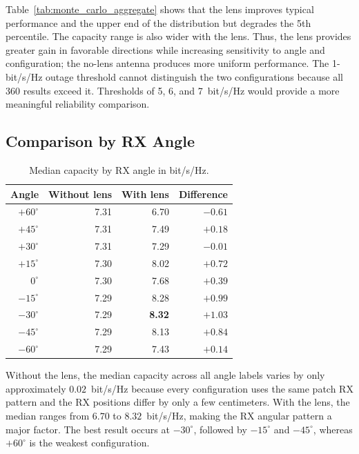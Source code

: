 \documentclass[10pt]{article}
\begin{document}
Table~\ref{tab:monte_carlo_aggregate} shows that the lens improves typical
performance and the upper end of the distribution but degrades the 5th
percentile. The capacity range is also wider with the lens. Thus, the lens
provides greater gain in favorable directions while increasing sensitivity
to angle and configuration; the no-lens antenna produces more uniform
performance. The 1-bit/s/Hz outage threshold cannot distinguish the two
configurations because all 360 results exceed it. Thresholds of 5, 6, and
7~bit/s/Hz would provide a more meaningful reliability comparison.

\subsection{Comparison by RX Angle}

\begin{table}[H]
    \centering
    \caption{Median capacity by RX angle in bit/s/Hz.}
    \label{tab:monte_carlo_angle_capacity}
    \small
    \begin{tabular}{rrrr}
        \hline
        \textbf{Angle} & \textbf{Without lens} & \textbf{With lens} &
        \textbf{Difference} \\
        \hline
        $+60^\circ$ & 7.31 & 6.70 & $-0.61$ \\
        $+45^\circ$ & 7.31 & 7.49 & $+0.18$ \\
        $+30^\circ$ & 7.31 & 7.29 & $-0.01$ \\
        $+15^\circ$ & 7.30 & 8.02 & $+0.72$ \\
        $0^\circ$   & 7.30 & 7.68 & $+0.39$ \\
        $-15^\circ$ & 7.29 & 8.28 & $+0.99$ \\
        $-30^\circ$ & 7.29 & \textbf{8.32} & $\mathbf{+1.03}$ \\
        $-45^\circ$ & 7.29 & 8.13 & $+0.84$ \\
        $-60^\circ$ & 7.29 & 7.43 & $+0.14$ \\
        \hline
    \end{tabular}
\end{table}

Without the lens, the median capacity across all angle labels varies by only
approximately $0.02$~bit/s/Hz because every configuration uses the same
patch RX pattern and the RX positions differ by only a few centimeters. With
the lens, the median ranges from $6.70$ to $8.32$~bit/s/Hz, making the RX
angular pattern a major factor. The best result occurs at $-30^\circ$,
followed by $-15^\circ$ and $-45^\circ$, whereas $+60^\circ$ is the weakest
configuration.
\end{document}
